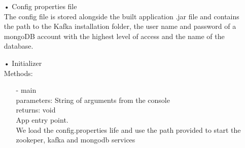 \documentclass[twoside, english, draft]{design}
\begin{document}
\begin{itemize}

	\item[•] Config properties file 
	\\The config file is stored alongside the built application .jar file and contains the path to the Kafka installation folder, the user name and password of a mongoDB account with the highest level of access and the name of the database.
	
	\item[•]Initializer
		\\Methods:
		\begin{itemize}
			\item[-]main
				\\ parameters: String of arguments from the console
				\\ returns: void
			 	\\ App entry point.
   			 	\\ We load the config.properties life and use the path provided to start the zookeper, kafka and mongodb services
		\end{itemize}
		

\end{itemize}
\end{document}
